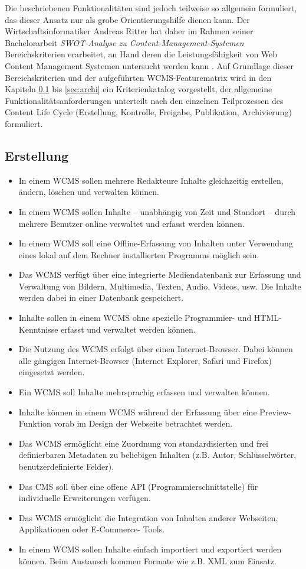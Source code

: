 Die beschriebenen Funktionalitäten sind jedoch teilweise so allgemein formuliert, das dieser Ansatz nur als grobe Orientierungshilfe dienen kann. Der Wirtschaftsinformatiker Andreas Ritter hat daher im Rahmen seiner Bachelorarbeit \emph{SWOT-Analyse zu Content-Management-Systemen} \cite{RitterSwot} Bereichskriterien erarbeitet, an Hand deren die Leistungsfähigkeit von Web Content Management Systemen untersucht werden kann \citep[][Seite 21-23]{RitterSwot}. Auf Grundlage dieser Bereichskriterien und der aufgeführten WCMS-Featurematrix wird in den Kapiteln \ref{sec:erstellung} bis \ref{sec:archi} ein Kriterienkatalog vorgestellt, der allgemeine Funktionalitätsanforderungen unterteilt nach den einzelnen Teilprozessen des Content Life Cycle (Erstellung, Kontrolle, Freigabe, Publikation, Archivierung) formuliert.

\subsection{Erstellung}
\label{sec:erstellung}
\begin{itemize}
\item
In einem WCMS sollen mehrere Redakteure Inhalte gleichzeitig erstellen, ändern, löschen und verwalten können.
\item
In einem WCMS sollen Inhalte – unabhängig von Zeit und Standort – durch mehrere Benutzer online verwaltet und erfasst werden können.
\item
In einem WCMS soll eine Offline-Erfassung von Inhalten unter Verwendung eines lokal auf dem Rechner installierten Programms möglich sein.
\item
Das WCMS verfügt über eine integrierte Mediendatenbank zur Erfassung und Verwaltung von Bildern, Multimedia, Texten, Audio, Videos, usw. Die Inhalte werden dabei in einer Datenbank gespeichert.
\item
Inhalte sollen in einem WCMS ohne spezielle Programmier- und HTML-Kenntnisse erfasst und verwaltet werden können.
\item
Die Nutzung des WCMS erfolgt über einen Internet-Browser. Dabei können alle gängigen Internet-Browser (Internet Explorer, Safari und Firefox) eingesetzt werden.
\item
Ein WCMS soll Inhalte mehrsprachig erfassen und verwalten können.
\item
Inhalte können in einem WCMS während der Erfassung über eine Preview-Funktion vorab im Design der Webseite betrachtet werden.
\item
Das WCMS ermöglicht eine Zuordnung von standardisierten und frei definierbaren Metadaten zu beliebigen Inhalten (z.B. Autor, Schlüsselwörter, benutzerdefinierte Felder).
\item
Das CMS soll über eine offene API (Programmierschnittstelle) für individuelle Erweiterungen verfügen.
\item
Das WCMS ermöglicht die Integration von Inhalten anderer Webseiten, Applikationen oder E-Commerce- Tools.
\item
In einem WCMS sollen Inhalte einfach importiert und exportiert werden können. Beim Austausch kommen Formate wie z.B. XML zum Einsatz.
\end{itemize}



